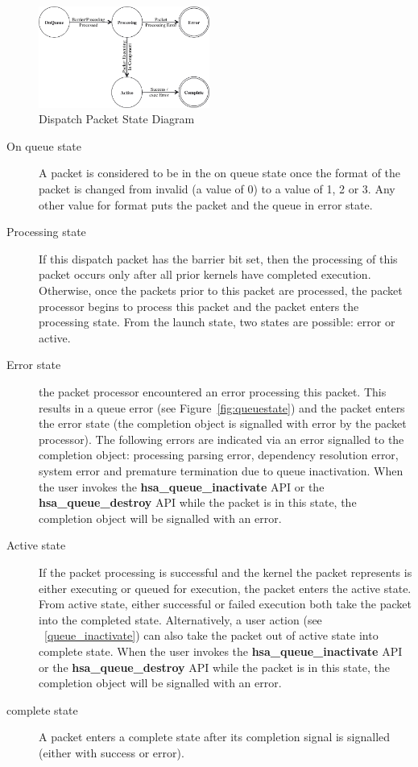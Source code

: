 \documentclass{book}
\newcommand{\reffun}[1]{\textbf{#1}}
\begin{document}
\begin{figure}
  \centering
  \includegraphics[width=0.5\textwidth] {fig/packetstate}
  \centering
  \caption{Dispatch Packet State Diagram}
  \label{fig:packetstate}
\end{figure}

\begin{description}
\item[On queue state] A packet is considered to be in the on queue
state once the format of the packet is changed from invalid (a value
of 0) to a value of 1, 2 or 3. Any other value for format puts the
packet and the queue in error state.

\item[Processing state] If this dispatch packet has the barrier bit
set, then the processing of this packet occurs only after all prior
kernels have completed execution.  Otherwise, once the packets prior
to this packet are processed, the packet processor begins to process
this packet and the packet enters the processing state.  From the
launch state, two states are possible: error or active.

\item[Error state] the packet processor encountered an error
processing this packet. This results in a queue error (see
Figure~\ref{fig:queuestate}) and the packet enters the error state
(the completion object is signalled with error by the packet
processor). The following errors are indicated via an error signalled
to the completion object:
processing parsing error, dependency resolution error, system error
and premature termination due to queue inactivation.
When the user invokes the
\reffun{hsa\_queue\_inactivate} API or the
\reffun{hsa\_queue\_destroy} API while the packet is in this state, the
completion object will be signalled with an error.

\item[Active state] If the packet processing is successful and the
kernel the packet represents is either executing or queued for
execution, the packet enters the active state. From active state,
either successful or failed execution both take the packet into the
completed state.  Alternatively, a user action (see
~\ref{queue_inactivate}) can also take the packet out of
active state into complete state.  When the user invokes the
\reffun{hsa\_queue\_inactivate} API or the
\reffun{hsa\_queue\_destroy} API while the packet is in this state, the
completion object will be signalled with an error.

\item[complete state] A packet enters a complete state after its
completion signal is signalled (either with success or error).
\end{description}
\end{document}
